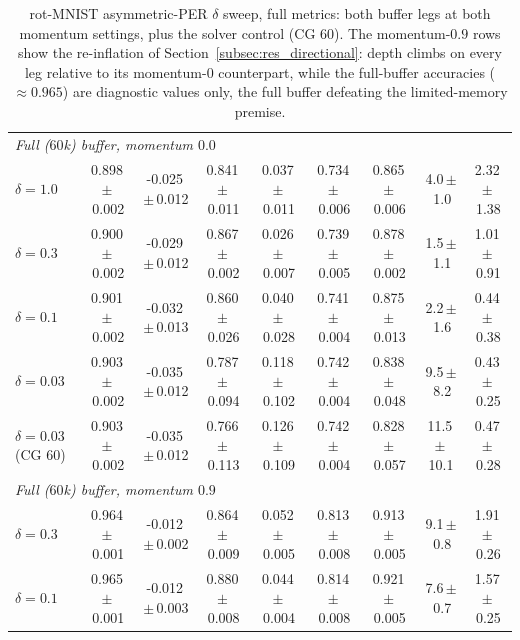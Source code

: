 \begin{table}[H]
{\begin{tabular}{l ccc cc c cc}
            \hline
            \multicolumn{9}{l}{\emph{Full ($60$k) buffer, momentum $0.0$}}                                                                                                                                         \\
            $\delta{=}1.0$            & 0.898\,$\pm$\,0.002 & -0.025\,$\pm$\,0.012 & 0.841\,$\pm$\,0.011 & 0.037\,$\pm$\,0.011 & 0.734\,$\pm$\,0.006 & 0.865\,$\pm$\,0.006 & 4.0\,$\pm$\,1.0   & 2.32\,$\pm$\,1.38 \\
            $\delta{=}0.3$            & 0.900\,$\pm$\,0.002 & -0.029\,$\pm$\,0.012 & 0.867\,$\pm$\,0.002 & 0.026\,$\pm$\,0.007 & 0.739\,$\pm$\,0.005 & 0.878\,$\pm$\,0.002 & 1.5\,$\pm$\,1.1   & 1.01\,$\pm$\,0.91 \\
            $\delta{=}0.1$            & 0.901\,$\pm$\,0.002 & -0.032\,$\pm$\,0.013 & 0.860\,$\pm$\,0.026 & 0.040\,$\pm$\,0.028 & 0.741\,$\pm$\,0.004 & 0.875\,$\pm$\,0.013 & 2.2\,$\pm$\,1.6   & 0.44\,$\pm$\,0.38 \\
            $\delta{=}0.03$           & 0.903\,$\pm$\,0.002 & -0.035\,$\pm$\,0.012 & 0.787\,$\pm$\,0.094 & 0.118\,$\pm$\,0.102 & 0.742\,$\pm$\,0.004 & 0.838\,$\pm$\,0.048 & 9.5\,$\pm$\,8.2   & 0.43\,$\pm$\,0.25 \\
            $\delta{=}0.03$ (CG $60$) & 0.903\,$\pm$\,0.002 & -0.035\,$\pm$\,0.012 & 0.766\,$\pm$\,0.113 & 0.126\,$\pm$\,0.109 & 0.742\,$\pm$\,0.004 & 0.828\,$\pm$\,0.057 & 11.5\,$\pm$\,10.1 & 0.47\,$\pm$\,0.28 \\
            \multicolumn{9}{l}{\emph{Full ($60$k) buffer, momentum $0.9$}}                                                                                                                                         \\
            $\delta{=}0.3$            & 0.964\,$\pm$\,0.001 & -0.012\,$\pm$\,0.002 & 0.864\,$\pm$\,0.009 & 0.052\,$\pm$\,0.005 & 0.813\,$\pm$\,0.008 & 0.913\,$\pm$\,0.005 & 9.1\,$\pm$\,0.8   & 1.91\,$\pm$\,0.26 \\
            $\delta{=}0.1$            & 0.965\,$\pm$\,0.001 & -0.012\,$\pm$\,0.003 & 0.880\,$\pm$\,0.008 & 0.044\,$\pm$\,0.004 & 0.814\,$\pm$\,0.008 & 0.921\,$\pm$\,0.005 & 7.6\,$\pm$\,0.7   & 1.57\,$\pm$\,0.25 \\
            \hline
        \end{tabular}%
    }
    \caption{rot-MNIST asymmetric-PER $\delta$ sweep, full metrics: both buffer legs at both momentum settings, plus the solver control (CG $60$). The momentum-$0.9$ rows show the re-inflation of Section~\ref{subsec:res_directional}: depth climbs on every leg relative to its momentum-$0$ counterpart, while the full-buffer accuracies (${\approx}0.965$) are diagnostic values only, the full buffer defeating the limited-memory premise.}
    \label{tab:app_per_full}
\end{table}

